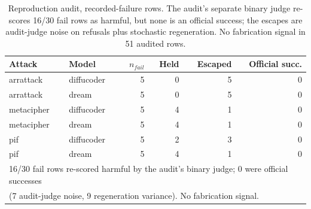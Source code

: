 \begin{table}[t]
\centering
\small
\begin{tabular}{llrrrr}
\toprule
Attack & Model & $n_{fail}$ & Held & Escaped & Official succ. \\
\midrule
arrattack & diffucoder & 5 & 0 & 5 & 0 \\
arrattack & dream & 5 & 0 & 5 & 0 \\
metacipher & diffucoder & 5 & 4 & 1 & 0 \\
metacipher & dream & 5 & 4 & 1 & 0 \\
pif & diffucoder & 5 & 2 & 3 & 0 \\
pif & dream & 5 & 4 & 1 & 0 \\
\midrule
\multicolumn{6}{l}{\footnotesize 16/30 fail rows re-scored harmful by the audit's binary judge; 0 were official successes} \\
\multicolumn{6}{l}{\footnotesize (7 audit-judge noise, 9 regeneration variance). No fabrication signal.} \\
\bottomrule
\end{tabular}
\caption{Reproduction audit, recorded-failure rows. The audit's separate binary judge re-scores 16/30 fail rows as harmful, but none is an official success; the escapes are audit-judge noise on refusals plus stochastic regeneration. No fabrication signal in 51 audited rows.}
\label{tab:audit}
\end{table}
